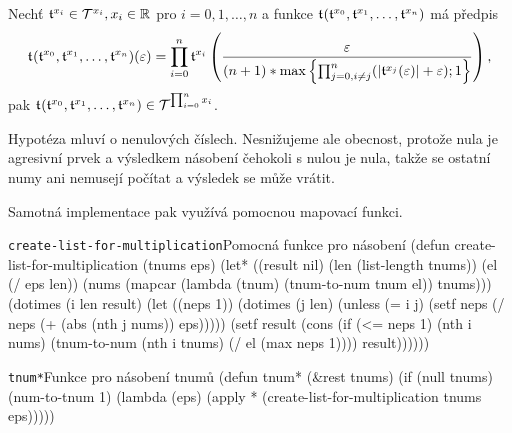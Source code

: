 \begin{hypothesis}\label{vet:soucin_tnumu}
Nechť $\mathfrak{t}^{x_i}\in\mathcal{T}^{x_i}, x_i\in\mathbb{R}$ pro $i=0,1,\ldots,n$ a funkce $\mathfrak{t}^{}(\mathfrak{t}^{x_0},\mathfrak{t}^{x_1},\ldots,\mathfrak{t}^{x_n})$ má předpis
\begin{equation}
\mathfrak{t}^{}(\mathfrak{t}^{x_0},\mathfrak{t}^{x_1},\ldots,\mathfrak{t}^{x_n})(\varepsilon)=\prod_{i=0}^n\mathfrak{t}^{x_i}\left(\frac{\varepsilon}{(n+1)*\mathrm{max}\left\{\prod_{j=0, i\neq j}^n(|\mathfrak{t}^{x_j}(\varepsilon)|+\varepsilon);1\right\}}\right),
\end{equation}
pak $\mathfrak{t}^{}(\mathfrak{t}^{x_0},\mathfrak{t}^{x_1},\ldots,\mathfrak{t}^{x_n})\in\mathcal{T}^{\prod_{i=0}^nx_i}$.
\end{hypothesis}

Hypotéza mluví o nenulových číslech. Nesnižujeme ale obecnost, protože nula je agresivní prvek a výsledkem násobení čehokoli s nulou je nula, takže se ostatní numy ani nemusejí počítat a výsledek se může vrátit.

Samotná implementace pak využívá pomocnou mapovací funkci.

\begin{lispcode}{\texttt{create-list-for-multiplication}}{Pomocná fun\-kce pro násobení}
(\textcolor{funkcionalni}{defun} \textcolor{pojmenovan}{create-list-for-multiplication} (tnums eps)
  (\textcolor{vedlejsi}{let*} ((result nil) (len (\textcolor{funkcionalni}{list-length} tnums)) (el (\textcolor{matematicke}{/} eps len))
         (nums (\textcolor{funkcionalni}{mapcar} (\textcolor{funkcionalni}{lambda} (tnum) 
                         (\textcolor{moje}{tnum-to-num} tnum el)) tnums)))
    (\textcolor{funkcionalni}{dotimes} (i len result)
      (\textcolor{vedlejsi}{let} ((neps 1))
        (\textcolor{funkcionalni}{dotimes} (j len)
          (\textcolor{funkcionalni}{unless} (\textcolor{matematicke}{=} i j)
            (\textcolor{vedlejsi}{setf} neps (\textcolor{matematicke}{/} neps (\textcolor{matematicke}{+} (\textcolor{matematicke}{abs} (\textcolor{funkcionalni}{nth} j nums)) eps)))))
        (\textcolor{vedlejsi}{setf} result (cons
                      (\textcolor{funkcionalni}{if} (\textcolor{matematicke}{<=} neps 1) (\textcolor{funkcionalni}{nth} i nums)
                        (\textcolor{moje}{tnum-to-num} (\textcolor{funkcionalni}{nth} i tnums)
                                     (\textcolor{matematicke}{/} el (max neps 1))))
                      result))))))
\end{lispcode}

\begin{lispcode}{\texttt{tnum*}}{Funkce pro násobení tnumů}
(\textcolor{funkcionalni}{defun} \textcolor{pojmenovan}{tnum*} (&rest tnums)
  (\textcolor{funkcionalni}{if} (\textcolor{funkcionalni}{null} tnums)
      (\textcolor{moje}{num-to-tnum} 1)
    (\textcolor{funkcionalni}{lambda} (eps)
      (\textcolor{funkcionalni}{apply} \textquotesingle\textcolor{moje}{*} (\textcolor{moje}{create-list-for-multiplication} tnums eps)))))
\end{lispcode}

